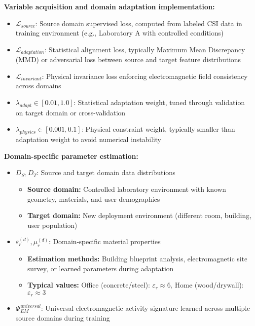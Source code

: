 \documentclass[12pt,a4paper]{article}
\begin{document}
\textbf{Variable acquisition and domain adaptation implementation:}
\begin{itemize}
\item $\mathcal{L}_{source}$: Source domain supervised loss, computed from labeled CSI data in training environment (e.g., Laboratory A with controlled conditions)
\item $\mathcal{L}_{adaptation}$: Statistical alignment loss, typically Maximum Mean Discrepancy (MMD) or adversarial loss between source and target feature distributions
\item $\mathcal{L}_{invariant}$: Physical invariance loss enforcing electromagnetic field consistency across domains
\item $\lambda_{adapt} \in [0.01, 1.0]$: Statistical adaptation weight, tuned through validation on target domain or cross-validation
\item $\lambda_{physics} \in [0.001, 0.1]$: Physical constraint weight, typically smaller than adaptation weight to avoid numerical instability
\end{itemize}

\textbf{Domain-specific parameter estimation:}
\begin{itemize}
\item $D_S, D_T$: Source and target domain data distributions
\begin{itemize}
\item \textbf{Source domain:} Controlled laboratory environment with known geometry, materials, and user demographics
\item \textbf{Target domain:} New deployment environment (different room, building, user population)
\end{itemize}
\item $\varepsilon_r^{(d)}, \mu_r^{(d)}$: Domain-specific material properties
\begin{itemize}
\item \textbf{Estimation methods:} Building blueprint analysis, electromagnetic site survey, or learned parameters during adaptation
\item \textbf{Typical values:} Office (concrete/steel): $\varepsilon_r \approx 6$, Home (wood/drywall): $\varepsilon_r \approx 3$
\end{itemize}
\item $\Phi_{EM}^{universal}$: Universal electromagnetic activity signature learned across multiple source domains during training
\end{itemize}
\end{document}
